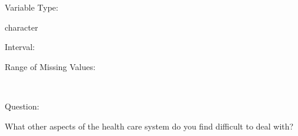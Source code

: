 \documentclass[
]{article}
\begin{document}
\begin{minipage}[t]{0.3\linewidth}

Variable Type:

\end{minipage}%
\begin{minipage}[t]{0.7\linewidth}

character

\end{minipage}

\begin{minipage}[t]{0.3\linewidth}

Interval:

\end{minipage}%
\begin{minipage}[t]{0.7\linewidth}

\end{minipage}

\begin{minipage}[t]{0.3\linewidth}

Range of Missing Values:

\end{minipage}%
\begin{minipage}[t]{0.7\linewidth}

~

\end{minipage}

\begin{minipage}[t]{0.3\linewidth}

Question:

\end{minipage}%
\begin{minipage}[t]{0.7\linewidth}

What other aspects of the health care system do you find difficult to
deal with?

\end{minipage}
\end{document}
